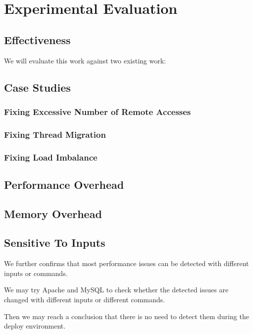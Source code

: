 \section{Experimental Evaluation}
\label{sec:evaluation}

\subsection{Effectiveness}
We will evaluate this work against two existing work:

%




\subsection{Case Studies}
\label{sec:casestudies}

\subsubsection{Fixing Excessive Number of Remote Accesses}

\subsubsection{Fixing Thread Migration} 

\subsubsection{Fixing Load Imbalance}
\subsection{Performance Overhead}

\subsection{Memory Overhead}

\subsection{Sensitive To Inputs}
We further confirms that most performance issues can be detected with different inputs or commands. 

We may try Apache and MySQL to check whether the detected issues are changed with different inputs or different commands. 

Then we may reach a conclusion that there is no need to detect them during the deploy environment. 

